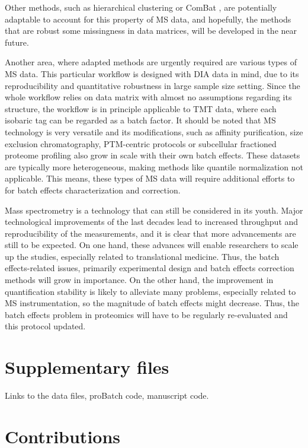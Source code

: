 \documentclass[num-refs]{wiley-article}
\begin{document}
Other methods, such as hierarchical clustering or ComBat \cite{Johnson:2007aa}, are potentially adaptable to account for this property of MS data, and hopefully, the methods that are robust some missingness in data matrices, will be developed in the near future.

Another area, where adapted methods are urgently required are various types of MS data. This particular workflow is designed with DIA data in mind, due to its reproducibility and quantitative robustness in large sample size setting. Since the whole workflow relies on data matrix with almost no assumptions regarding its structure, the workflow is in principle applicable to TMT data, where each isobaric tag can be regarded as a batch factor. It should be noted that MS technology is very versatile and its modifications, such as affinity purification, size exclusion chromatography, PTM-centric protocols or subcellular fractioned proteome profiling also grow in scale with their own batch effects. These datasets are typically more heterogeneous, making methods like quantile normalization not applicable. This means, these types of MS data will require additional efforts to for batch effects characterization and correction.

Mass spectrometry is a technology that can still be considered in its youth. Major technological improvements of the last decades lead to increased throughput and reproducibility of the measurements, and it is clear that more advancements are still to be expected. On one hand, these advances will enable researchers to scale up the studies, especially related to translational medicine. Thus, the batch effects-related issues, primarily experimental design and batch effects correction methods will grow in importance. On the other hand, the improvement in quantification stability is likely to alleviate many problems, especially related to MS instrumentation, so the magnitude of batch effects might decrease. Thus, the batch effects problem in proteomics will have to be regularly re-evaluated and this protocol updated.





\section*{Supplementary files}
Links to the data files, proBatch code, manuscript code.

\section*{Contributions}
\end{document}
